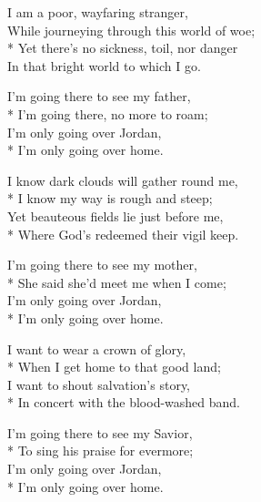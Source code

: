 
\versemark
I am a poor, wayfaring stranger,\\
While journeying through this world of woe;\\*
Yet there’s no sickness, toil, nor danger\\
In that bright world to which I go.

I’m going there to see my father,\\*
I’m going there, no more to roam;\\
I’m only going over Jordan,\\*
I’m only going over home.

\versemark
I know dark clouds will gather round me,\\*
I know my way is rough and steep;\\
Yet beauteous fields lie just before me,\\*
Where God’s redeemed their vigil keep.

I’m going there to see my mother,\\*
She said she’d meet me when I come;\\
I’m only going over Jordan,\\*
I’m only going over home.

\versemark
I want to wear a crown of glory,\\*
When I get home to that good land;\\
I want to shout salvation’s story,\\*
In concert with the blood-washed band.

I’m going there to see my Savior,\\*
To sing his praise for evermore;\\
I’m only going over Jordan,\\*
I’m only going over home.

